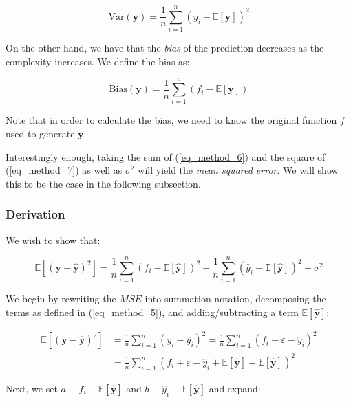 \documentclass[a4paper,10pt,english]{article}
\begin{document}
\begin{multicols*}{2}
\begin{equation}
\label{eq_method_6}
\text{Var}(\mathbf{y}) = \frac{1}{n} \sum_{i=1}^{n} (y_i - \mathbb{E}[\mathbf{y}] )^2
\end{equation}

On the other hand, we have that the \textit{bias} of the prediction decreases as the complexity increases.  We define the bias as:

\begin{equation}
\label{eq_method_7}
\text{Bias}(\mathbf{y}) = \frac{1}{n} \sum_{i=1}^{n} (f_i - \mathbb{E}[\mathbf{y}] )
\end{equation}

Note that in order to calculate the bias, we need to know the original function $f$ used to generate $\mathbf{y}$.

Interestingly enough, taking the sum of (\ref{eq_method_6}) and the square of (\ref{eq_method_7}) as well as $\sigma^2$ will yield the \textit{mean squared error}.  We will show this to be the case in the following subsection.

\subsubsection*{Derivation}

We wish to show that:

\begin{equation}
\label{eq_method_8}
\mathbb{E}\left[(\mathbf{y}-\hat{\mathbf{y}})^{2}\right]
=\frac{1}{n} \sum_{i=1}^{n}(f_{i}-\mathbb{E}[\hat{\mathbf{y}}])^{2}+\frac{1}{n} \sum_{i=1}^{n}(\hat{y}_{i}-\mathbb{E}[\hat{\mathbf{y}}])^{2}+\sigma^{2}
\end{equation}

We begin by rewriting the $MSE$ into summation notation, decomposing the terms as defined in (\ref{eq_method_5}), and adding/subtracting a term $\mathbb{E}[\hat{\mathbf{y}}]$:

\begin{align*}
\mathbb{E}\left[(\mathbf{y}-\hat{\mathbf{y}})^{2}\right] &= \frac{1}{n} \sum_{i=1}^{n} ( y_i - \hat{y}_i )^2 = \frac{1}{n} \sum_{i=1}^{n} ( f_i + \varepsilon - \hat{y}_i )^2 \\
&= \frac{1}{n} \sum_{i=1}^{n} ( f_i + \varepsilon - \hat{y}_i  + \mathbb{E}[\hat{\mathbf{y}}] - \mathbb{E}[\hat{\mathbf{y}}] )^2
\end{align*}

Next, we set $a \equiv f_i - \mathbb{E}[\hat{\mathbf{y}}] $ and $b \equiv \hat{y}_i - \mathbb{E}[\hat{\mathbf{y}}]$ and expand:


\end{multicols*}
\end{document}
